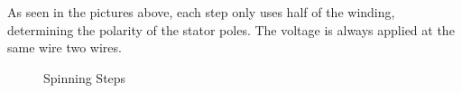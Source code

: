 As seen in the pictures above, each step only uses half of the winding, determining the polarity of the stator poles. The voltage is always applied at the same wire two wires.
\begin{figure}[htp] 
    \centering
    \hfill
    \hfill
\end{figure}
\newpage
\begin{figure}[htp]
   	\centering
  	\hfill
  	\caption{Spinning Steps}
\end{figure}
